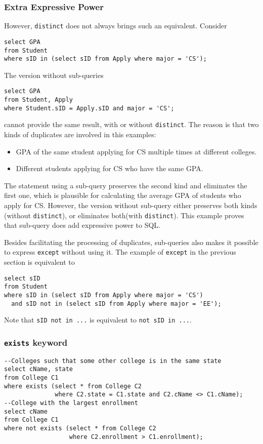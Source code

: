 \subsubsection{Extra Expressive Power}
However, \texttt{distinct} does not always brings such an equivalent. Consider
\begin{lstlisting}
select GPA
from Student
where sID in (select sID from Apply where major = 'CS');
\end{lstlisting}
The version without sub-queries
\begin{lstlisting}
select GPA
from Student, Apply
where Student.sID = Apply.sID and major = 'CS';
\end{lstlisting}
cannot provide the same result, with or without \texttt{distinct}. The reason is that two kinds of duplicates are involved in this examples:
\begin{itemize}
\item GPA of the same student applying for CS multiple times at different colleges.
\item Different students applying for CS who have the same GPA.
\end{itemize}
The statement using a sub-query preserves the second kind and eliminates the first one, which is plausible for calculating the average GPA of students who apply for CS. However, the version without sub-query either preserves both kinds (without \texttt{distinct}), or eliminates both(with \texttt{distinct}). This example proves that sub-query does add expressive power to SQL.

Besides facilitating the processing of duplicates, sub-queries also makes it possible to express \texttt{except} without using it. The example of \texttt{except} in the previous section is equivalent to
\begin{lstlisting}
select sID 
from Student
where sID in (select sID from Apply where major = 'CS')
  and sID not in (select sID from Apply where major = 'EE');
\end{lstlisting}
Note that \texttt{sID not in ...} is equivalent to \texttt{not sID in ...}.
\subsubsection{\texttt{exists} keyword}
\begin{lstlisting}
--Colleges such that some other college is in the same state
select cName, state
from College C1
where exists (select * from College C2 
              where C2.state = C1.state and C2.cName <> C1.cName);
--College with the largest enrollment
select cName
from College C1
where not exists (select * from College C2
	              where C2.enrollment > C1.enrollment);
\end{lstlisting}
